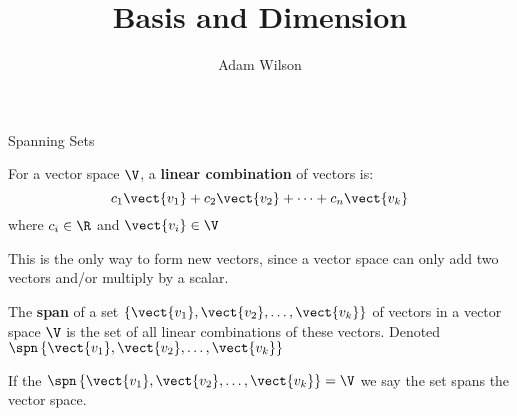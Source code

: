 \documentclass{beamer}
\title[MATH 2250 - Section 3.6]{Basis and Dimension}
\author{Adam Wilson}
\institute{Salt Lake Community College}
\date{}
\begin{document}
\begin{frame}
  \titlepage
\end{frame}

\begin{frame}{Spanning Sets}
\begin{definition}
For a vector space $\V$, a \textbf{linear combination} of vectors is:
\begin{equation*}
c_1\vect{v_1}+c_2\vect{v_2}+\cdots+c_n\vect{v_k}
\end{equation*}
where $c_i\in\R$ and $\vect{v_i}\in\V$
\end{definition}\pause
\begin{block}{}
This is the only way to form new vectors, since a vector space can only add two vectors and/or multiply by a scalar.
\end{block}\pause
\begin{definition}
The \textbf{span} of a set $\left\{\vect{v_1}, \vect{v_2}, \ldots, \vect{v_k}\right\}$ of vectors in a vector space $\V$ is the set of all linear combinations of these vectors. Denoted $\spn\left\{\vect{v_1}, \vect{v_2}, \dots, \vect{v_k}\right\}$
\end{definition}\pause
\begin{block}{}
If the $\spn\left\{\vect{v_1}, \vect{v_2}, \dots, \vect{v_k}\right\}=\V$ we say the set spans the vector space.
\end{block}
\end{frame}
\end{document}
